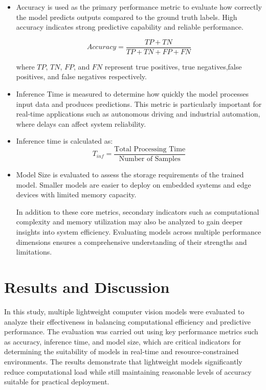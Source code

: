 \documentclass[conference]{IEEEtran}
\begin{document}
\begin{itemize}
\item Accuracy is used as the primary performance metric to evaluate how correctly the model predicts outputs compared to the ground truth labels. High accuracy indicates strong predictive capability and reliable performance.

\begin{equation}
Accuracy = \frac{TP + TN}{TP + TN + FP + FN}
\end{equation}

where $TP$, $TN$, $FP$, and $FN$ represent true positives, true negatives,false positives, and false negatives respectively.
\item Inference Time is measured to determine how quickly the model processes input data and produces predictions. This metric is particularly important for real-time applications such as autonomous driving and industrial automation, where delays can affect system reliability.

\item Inference time is calculated as:
\begin{equation}
T_{inf} = \frac{\text{Total Processing Time}}{\text{Number of Samples}}
\end{equation}
\item Model Size is evaluated to assess the storage requirements of the trained model. Smaller models are easier to deploy on embedded systems and edge devices with limited memory capacity.

In addition to these core metrics, secondary indicators such as computational complexity and memory utilization may also be analyzed to gain deeper insights into system efficiency. Evaluating models across multiple performance dimensions ensures a comprehensive understanding of their strengths and limitations.
\end{itemize}

\section{Results and Discussion}

In this study, multiple lightweight computer vision models were evaluated to analyze their effectiveness in balancing computational efficiency and predictive performance. The evaluation was carried out using key performance metrics such as accuracy, inference time, and model size, which are critical indicators for determining the suitability of models in real-time and resource-constrained environments. The results demonstrate that lightweight models significantly reduce computational load while still maintaining reasonable levels of accuracy suitable for practical deployment.
\end{document}
